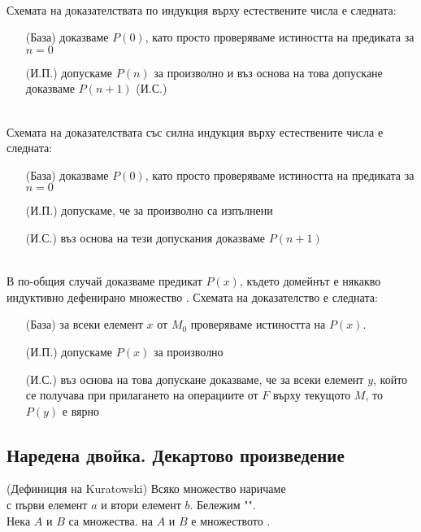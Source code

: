  \\
Схемата на доказателствата по индукция върху естествените числа е следната:
\begin{enumerate}
    \item[(База)] доказваме \(P(0)\), като просто проверяваме истиността на предиката за \(n = 0\)
    \item[(И.П.)] допускаме \(P(n)\) за произволно  и въз основа на това 
    допускане доказваме \(P(n + 1)\) (И.С.)
\end{enumerate}


 \\
Схемата на доказателствата със силна индукция върху естествените числа е следната:
\begin{enumerate}
    \item[(База)] доказваме \(P(0)\), като просто проверяваме истиността на предиката за \(n = 0\)
    \item[(И.П.)] допускаме, че за произволно  са изпълнени 
    \item[(И.С.)] въз основа на тези допускания доказваме \(P(n + 1)\) 
\end{enumerate}


 \\
В по-общия случай доказваме предикат \(P(x)\), където домейнът е някакво индуктивно дефенирано 
множество . Схемата на доказателство е следната:
\begin{itemize}
    \item[(База)] за всеки елемент \(x\) от \(M_0\) проверяваме истиността на \(P(x)\).
    \item[(И.П.)] допускаме \(P(x)\) за произволно 
    \item[(И.С.)] въз основа на това допускане доказваме, че за всеки елемент \(y\), който се 
    получава при прилагането на операциите от \(F\) върху текущото \(M\), то \(P(y)\) е вярно
\end{itemize}


\subsection{Наредена двойка. Декартово произведение}
(Дефиниция на Kuratowski) Всяко множество  наричаме \\  с 
първи елемент \(a\) и втори елемент \(b\). Бележим "". \\

Нека \(A\) и \(B\) са множества.  на \(A\) и \(B\) е множеството 
.
